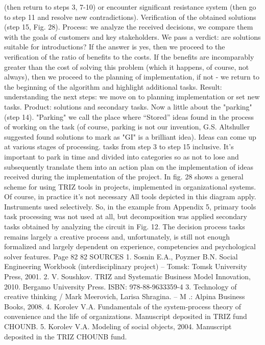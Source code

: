 (then return to steps 3, 7-10) or encounter significant resistance
system (then go to step 11 and resolve new contradictions).
Verification of the obtained solutions (step 15, Fig. 28).
Process: we analyze the received decisions, we compare them with the goals of customers
and key stakeholders. We pass a verdict: are solutions suitable for
introductions? If the answer is yes, then we proceed to the verification of the ratio of benefits
to the costs. If the benefits are incomparably greater than the cost of solving this problem (which
it happens, of course, not always), then we proceed to the planning of implementation, if not -
we return to the beginning of the algorithm and highlight additional tasks.
Result: understanding the next steps: we move on to planning implementation
or set new tasks.
Product: solutions and secondary tasks.
Now a little about the "parking" (step 14). "Parking" we call the place where
“Stored” ideas found in the process of working on the task (of course, parking is
not our invention, G.S. Altshuller suggested found solutions to mark as
"GI" is a brilliant idea). Ideas can come up at various stages of processing.
tasks from step 3 to step 15 inclusive. It’s important to park in time and
divided into categories so as not to lose and subsequently translate them into an action plan
on the implementation of ideas received during the implementation of the project.
In fig. 28 shows a general scheme for using TRIZ tools in projects,
implemented in organizational systems. Of course, in practice it’s not necessary
All tools depicted in this diagram apply. Instruments
used selectively. So, in the example from Appendix 5, primary tools
task processing was not used at all, but decomposition was applied
secondary tasks obtained by analyzing the circuit in Fig. 12. The decision process
tasks remains largely a creative process and, unfortunately, is still not enough
formalized and largely dependent on experience, competencies and psychological
solver features.
Page 82
82
SOURCES
1. Sosnin E.A., Poyzner B.N. Social Engineering Workbook
(interdisciplinary project) -- Tomsk: Tomsk University Press,
2001.
2. V. Soushkov. TRIZ and Systematic Business Model Innovation, 2010. Bergamo
University Press. ISBN: 978-88-9633359-4
3. Technology of creative thinking / Mark Meerovich, Larisa Shragina. -- M .:
Alpina Business Books, 2008.
4. Korolev V.A. Fundamentals of the system-process theory of convenience and
the life of organizations. Manuscript deposited in TRIZ fund
CHOUNB.
5. Korolev V.A. Modeling of social objects, 2004. Manuscript
deposited in the TRIZ CHOUNB fund.
